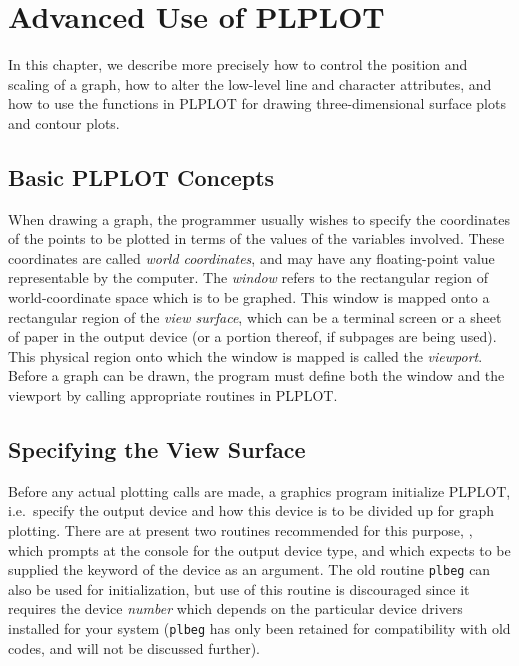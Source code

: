 
\chapter {Advanced Use of PLPLOT}\label{advanced}

In this chapter, we describe more precisely how to control the position
and scaling of a graph, how to alter the low-level line and character
attributes, and how to use the functions in PLPLOT for drawing
three-dimensional surface plots and contour plots.


\section {Basic PLPLOT Concepts}

When drawing a graph, the programmer usually wishes to specify the
coordinates of the points to be plotted in terms of the values of the
variables involved. These coordinates are called {\em world coordinates}, 
and may have any floating-point value representable by the computer. The
{\em window\/} refers to the rectangular region of world-coordinate space
which is to be graphed. This window is mapped onto a rectangular region of
the {\em view surface}, which can be a terminal screen or a sheet of paper
in the output device (or a portion thereof, if subpages are being used).
This physical region onto which the window is mapped is called the {\em
viewport}. Before a graph can be drawn, the program must define both the
window and the viewport by calling appropriate routines in PLPLOT. 


\section {Specifying the View Surface}

Before any actual plotting calls are made, a graphics program initialize
PLPLOT, i.e.~specify the output device and how this device is to be divided
up for graph plotting.  There are at present two routines recommended for
this purpose, , which prompts at the console for the output
device type, and  which expects to be supplied the keyword of
the device as an argument.  The old routine {\tt plbeg} can also be used for
initialization, but use of this routine is discouraged since it requires the
device {\em number\/} which depends on the particular device drivers installed
for your system ({\tt plbeg} has only been retained for compatibility with
old codes, and will not be discussed further).


